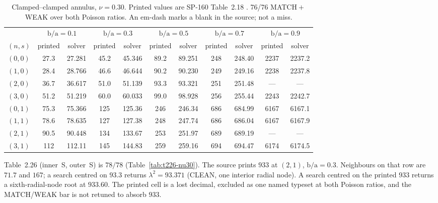 \documentclass[11pt]{article}
\newcommand{\lamsq}{\lambda^{2}}
\newcommand{\ba}{\mbox{b/a}}
\begin{document}
\begin{table}[htbp]\centering\footnotesize
\caption{Clamped--clamped annulus, $\nu=0.30$. Printed values are
SP-160 Table~2.18 \cite{leissaSP160,vogelSkinner}. 76/76
MATCH${}+{}$WEAK over both Poisson ratios. An em-dash marks a blank in
the source; not a miss.}
\label{tab:t218-nu30}
\begin{tabular}{lcccccccccc}
\toprule
& \multicolumn{2}{c}{$\ba=0.1$} & \multicolumn{2}{c}{$\ba=0.3$}
& \multicolumn{2}{c}{$\ba=0.5$} & \multicolumn{2}{c}{$\ba=0.7$}
& \multicolumn{2}{c}{$\ba=0.9$}\\
\cmidrule(lr){2-3}\cmidrule(lr){4-5}\cmidrule(lr){6-7}\cmidrule(lr){8-9}\cmidrule(lr){10-11}
$(n,s)$ & printed & solver & printed & solver & printed & solver
& printed & solver & printed & solver\\
\midrule
$(0,0)$ & 27.3 & 27.281 & 45.2 & 45.346 & 89.2 & 89.251 & 248 & 248.40 & 2237 & 2237.2 \\
$(1,0)$ & 28.4 & 28.766 & 46.6 & 46.644 & 90.2 & 90.230 & 249 & 249.16 & 2238 & 2237.8 \\
$(2,0)$ & 36.7 & 36.617 & 51.0 & 51.139 & 93.3 & 93.321 & 251 & 251.48 & --- & --- \\
$(3,0)$ & 51.2 & 51.219 & 60.0 & 60.033 & 99.0 & 98.928 & 256 & 255.44 & 2243 & 2242.7 \\
$(0,1)$ & 75.3 & 75.366 & 125 & 125.36 & 246 & 246.34 & 686 & 684.99 & 6167 & 6167.1 \\
$(1,1)$ & 78.6 & 78.635 & 127 & 127.38 & 248 & 247.74 & 686 & 686.04 & 6167 & 6167.9 \\
$(2,1)$ & 90.5 & 90.448 & 134 & 133.67 & 253 & 251.97 & 689 & 689.19 & --- & --- \\
$(3,1)$ & 112 & 112.11 & 145 & 144.83 & 259 & 259.16 & 694 & 694.47 & 6174 & 6174.5 \\
\bottomrule
\end{tabular}
\end{table}

Table~2.26 (inner~S, outer~S) is $78/78$ (Table~\ref{tab:t226-nu30}).
The source prints $933$ at $(2,1)$, $\ba=0.3$. Neighbours on that row are
$71.7$ and $167$; a search centred on $93.3$ returns $\lamsq=93.371$
(CLEAN, one interior radial node). A search centred on the printed $933$
returns a sixth-radial-node root at $933.60$. The printed cell is a lost
decimal, excluded as one named typeset at both Poisson ratios, and the
MATCH/WEAK bar is not retuned to absorb $933$.
\end{document}
